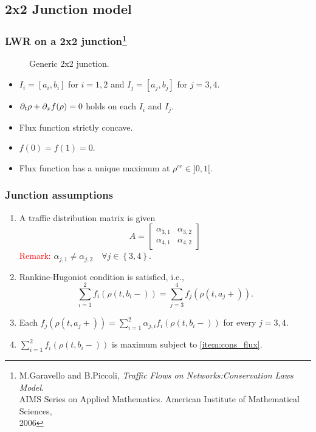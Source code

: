 \subsection{2x2 Junction model}
\begin{frame}
	\frametitle{LWR on a 2x2 junction\footnote[frame]{M.Garavello and B.Piccoli, \textit{Traffic Flows on Networks:Conservation Laws Model}. \\AIMS Series on Applied Mathematics. American Institute of Mathematical Sciences,\\2006}}
	\begin{figure}[ht]
\centering

\caption{Generic 2x2 junction.}
\label{fig:junction}
\end{figure}
	
\begin{itemize}
	\item $I_i=[a_i,b_i]$ for $i=1,2$ and $I_j=[a_j,b_j]$ for $j=3,4$.
	\item $\partial_t \rho +\partial_x f(\rho)=0$ holds on each $I_i$ and $I_j$.
	\item Flux function strictly concave.
	\item $f(0)=f(1)=0$.
	\item Flux function has a unique maximum at $\rho^{cr} \in ]0,1[$.
\end{itemize}
\end{frame}

\begin{frame}
	\frametitle{Junction assumptions}
\begin{enumerate} 
	\item A traffic distribution matrix is given \[
 A = \begin{bmatrix}
       \alpha_{3,1} & \alpha_{3,2}            \\[0.3em]
       \alpha_{4,1} & \alpha_{4,2}
     \end{bmatrix}
\]
\textcolor{red}{Remark:} $\alpha_{j,1}\neq\alpha_{j,2} \quad \forall j\in\left\lbrace3,4\right\rbrace.$
	\item Rankine-Hugoniot condition is satisfied, i.e., $$\sum_{i=1}^2 f_i(\rho(t,b_i-))=\sum_{j=3}^4 f_j(\rho(t,a_j+)).$$
	\item \label{item:cons_flux} Each $f_j(\rho(t,a_j+))=\sum\limits_{i=1}^2 \alpha_{j,i}f_i(\rho(t, b_i-))$ for every $j=3,4 .$
	\item $\sum\limits_{i=1}^2 f_i(\rho(t,b_i-))$	is maximum subject to \ref{item:cons_flux}. 
	
\end{enumerate}
	
\end{frame}

